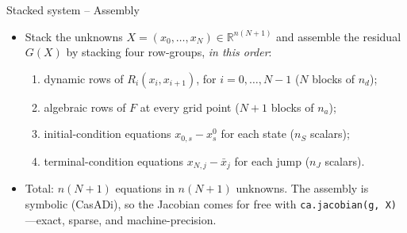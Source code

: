 \documentclass[11pt,aspectratio=169]{beamer}
\begin{document}
\begin{frame}{Stacked system -- Assembly}

\begin{itemize}

\item Stack the unknowns $X = (x_0,\ldots,x_N) \in \mathbb R^{n(N+1)}$ and
  assemble the residual $G(X)$ by stacking four row-groups,
  \emph{in this order}:\newline
  \begin{enumerate}
  \item dynamic rows of $R_i(x_i,x_{i+1})$, for $i=0,\ldots,N-1$
    \hfill ($N$ blocks of $n_d$);\newline
  \item algebraic rows of $F$ at every grid point
    \hfill ($N{+}1$ blocks of $n_a$);\newline
  \item initial-condition equations $x_{0,s} - x_s^0$ for each state
    \hfill ($n_S$ scalars);\newline
  \item terminal-condition equations $x_{N,j} - \bar x_j$ for each jump
    \hfill ($n_J$ scalars).\newline
  \end{enumerate}

\item Total: $n(N{+}1)$ equations in $n(N{+}1)$ unknowns. The
  assembly is symbolic (CasADi), so the Jacobian comes for free with
  \texttt{ca.jacobian(g, X)} —\;exact, sparse, and machine-precision.

\end{itemize}

\end{frame}
\end{document}
